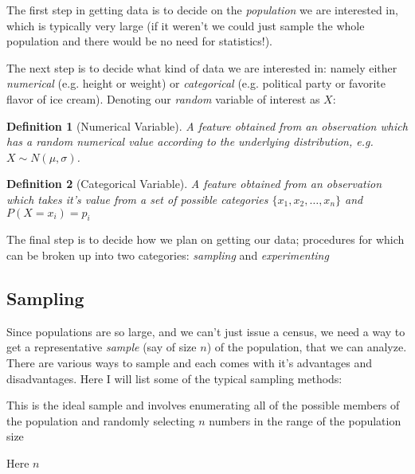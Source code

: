 \documentclass{article}
\newtheorem{mydef}{Definition}
\begin{document}
The first step in getting data is to decide on the \textit{population} we are interested in, which is typically very large (if it weren't we could just sample the whole population and there would be no need for statistics!). 

The next step is to decide what kind of data we are interested in: namely either \textit{numerical} (e.g. height or weight) or \textit{categorical} (e.g. political party or favorite flavor of ice cream). Denoting our \textit{random} variable of interest as $X$: 

\begin{mydef}[Numerical Variable] 
A feature obtained from an observation which has a random numerical value according to the underlying distribution, e.g. $X \sim N(\mu, \sigma)$.
\end{mydef}

\begin{mydef}[Categorical Variable] 
A feature obtained from an observation which takes it's value from a set of possible categories $\{x_1, x_2, \dots , x_n\}$ and $P(X = x_i) = p_i$
\end{mydef}

The final step is to decide how we plan on getting our data; procedures for which can be broken up into two categories: \textit{sampling} and \textit{experimenting} 

\subsection{Sampling}

Since populations are so large, and we can't just issue a census, we need a way to get a representative \textit{sample} (say of size $n$) of the population, that we can analyze.  There are various ways to sample and each comes with it's advantages and disadvantages.
\bigbreak
\noindent Here I will list some of the typical sampling methods:

\begin{description}[style=nextline]
\item [Simple Random Sample] This is the ideal sample and involves enumerating all of the possible members of the population and randomly selecting $n$ numbers in the range of the population size

\item [Survey Sample] Here $n$ 

\item [Stratified Random Sample]
    
\end{description}
\end{document}
